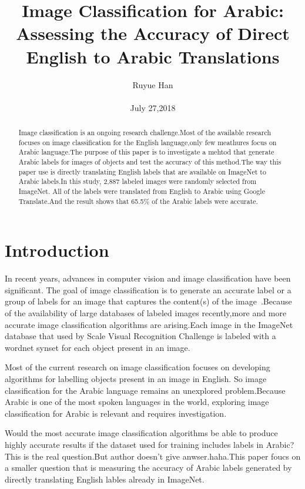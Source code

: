 \documentclass[10pt,twocolumn,letterpaper]{article}
\begin{document}
\title{Image Classification for Arabic: Assessing the Accuracy of
Direct English to Arabic Translations}

\author{Ruyue Han\\\\July 27,2018}

\maketitle

\begin{abstract}
   Image classification is an ongoing research challenge.Most of the available research focuses on image classification for the English language,only few meathures focus on Arabic language.The purpose of this paper is to investigate a mehtod that generate Arabic labels for images of objects and test the accuracy of this method.The way this paper use is directly translating English labels that are available on ImageNet to Arabic labels.In this study, 2,887 labeled images were randomly selected from ImageNet. All of the labels were translated from English to Arabic using Google Translate.And the result shows that 65.5\% of the Arabic labels were accurate.
\end{abstract}
\section{Introduction}
	In recent years, advances in computer vision and image classification have been significant. The goal of image classification is to generate an accurate label or a group of labels for an image that captures the content(s) of
the image~\cite{Classification2014_1}.Because of the availability of large databases of labeled images recently,more and more accurate image classification algorithms are arising.Each image in the ImageNet database that used by Scale Visual Recognition Challenge is labeled with a wordnet synset for each object present in an image.

Most of the current research on image classification focuses on developing algorithms for labelling objects present in an image in English. So image classification for the Arabic language remains an unexplored problem.Because Arabic is one of the most spoken languages in the world,  exploring image classification for Arabic is relevant and requires investigation.

Would the most accurate image classification algorithms be able to produce
highly accurate results if the dataset used for training includes labels in Arabic? This is the real question.But author doesn't give anwser.haha.This paper foucs on a smaller question that is measuring the accuracy of Arabic labels generated by directly translating English lables already in ImageNet.%
	
\end{document}
